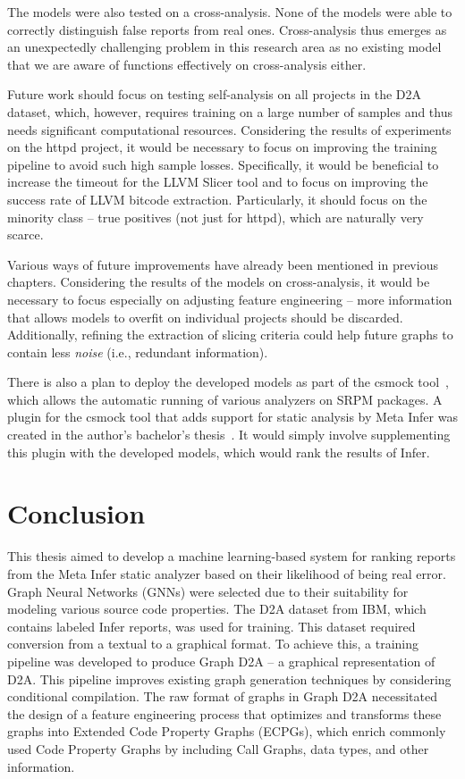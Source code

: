 The models were also tested on a cross-analysis. None of the models were able to correctly distinguish false reports from real ones. Cross-analysis thus emerges as an unexpectedly challenging problem in this research area as no existing model that we are aware of functions effectively on cross-analysis either.

Future work should focus on testing self-analysis on all projects in the D2A dataset, which, however, requires training on a large number of samples and thus needs significant computational resources. Considering the results of experiments on the httpd project, it would be necessary to focus on improving the training pipeline to avoid such high sample losses. Specifically, it would be beneficial to increase the timeout for the LLVM Slicer tool and to focus on improving the success rate of LLVM bitcode extraction. Particularly, it should focus on the minority class -- true positives (not just for httpd), which are naturally very scarce.

Various ways of future improvements have already been mentioned in previous chapters. Considering the results of the models on cross-analysis, it would be necessary to focus especially on adjusting feature engineering -- more information that allows models to overfit on individual projects should be discarded. Additionally, refining the extraction of slicing criteria could help future graphs to contain less \textit{noise} (i.e., redundant information).

There is also a plan to deploy the developed models as part of the csmock tool~\cite{CsmockAVM,CsmockFLOCK}, which allows the automatic running of various analyzers on SRPM packages. A plugin for the csmock tool that adds support for static analysis by Meta Infer was created in the author's bachelor's thesis~\cite{bc}. It would simply involve supplementing this plugin with the developed models, which would rank the results of Infer.


\chapter{Conclusion}
\label{conclusion}
This thesis aimed to develop a machine learning-based system for ranking reports from the Meta Infer static analyzer based on their likelihood of being real error. Graph Neural Networks (GNNs) were selected due to their suitability for modeling various source code properties. The D2A dataset from IBM, which contains labeled Infer reports, was used for training. This dataset required conversion from a textual to a graphical format. To achieve this, a training pipeline was developed to produce Graph D2A -- a graphical representation of D2A. This pipeline improves existing graph generation techniques by considering conditional compilation. The raw format of graphs in Graph D2A necessitated the design of a feature engineering process that optimizes and transforms these graphs into Extended Code Property Graphs (ECPGs), which enrich commonly used Code Property Graphs by including Call Graphs, data types, and other information.

